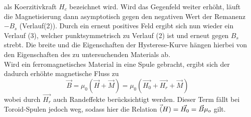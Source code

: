 als Koerzitivkraft $H_c $ bezeichnet wird. Wird das Gegenfeld weiter erhöht, läuft die
Magnetisierung dann asymptotisch gegen den negativen Wert der Remanenz $-B_s$ (Verlauf(2)).
Durch ein erneut positives Feld ergibt sich nun wieder ein Verlauf (3), welcher punktsymmetrisch
zu Verlauf (2) ist und erneut gegen $B_s$ strebt.
Die breite und die Eigenschaften der Hysterese-Kurve hängen hierbei von den
Eigenschaften des zu untersuchenden Materials ab.\\
\noindent
Wird ein ferromagnetisches Material in eine Spule gebracht, ergibt sich der dadurch
erhöhte magnetische Fluss zu
\begin{equation}
  \vec{B}= \mu_0 (\vec{H}+\vec{M}) = \mu_0 (\vec{H_0}+ \vec{H_r} +\vec{M})
\end{equation}
wobei durch $\vec{H_r}$ auch Randeffekte berücksichtigt werden. Dieser Term fällt
bei Toroid-Spulen jedoch weg, sodass hier die Relation $\vec(H) = \vec{H_0} =
\vec{B}\/ \mu_o $ gilt.
